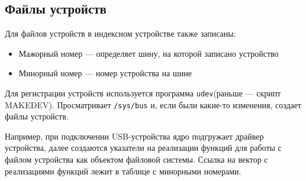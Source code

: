 \subsection*{Файлы устройств}

Для файлов устройств в индексном устройстве также записаны:
\begin{itemize}
\item Мажорный номер --- определяет шину, на которой записано устройство
\item Минорный номер --- номер устройства на шине
\end{itemize}

Для регистрации устройств используется программа \verb!udev!(раньше --- скрипт MAKEDEV). Просматривает \verb!/sys/bus! и, если были какие-то изменения, создает файлы устройств.

Например, при подключении USB-устройства ядро подгружает драйвер устройства, далее создаются указатели на реализации функций для работы  с файлом устройства как объектом файловой системы. Ссылка на вектор с реализациями функций лежит в таблице с минорными номерами.
